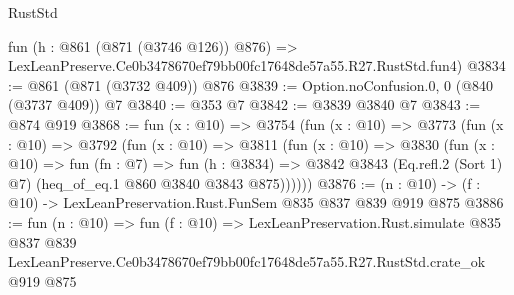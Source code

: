 \begin{lexlean}{RustStd}
\begin{coremodule}
    fun (h : @861 (@871 (@3746 @126)) @876) =>
    LexLeanPreserve.Ce0b3478670ef79bb00fc17648de57a55.R27.RustStd.fun4)
@3834 := @861 (@871 (@3732 @409)) @876
@3839 := Option.noConfusion.{0, 0} (@840 (@3737 @409)) @7
@3840 := @353 @7
@3842 := @3839 @3840 @7
@3843 := @874 @919
@3868 := fun (x : @10) =>
  @3754
    (fun (x : @10) =>
    @3773
      (fun (x : @10) =>
      @3792
        (fun (x : @10) =>
        @3811
          (fun (x : @10) =>
          @3830
            (fun (x : @10) =>
            fun (fn : @7) =>
            fun (h : @3834) =>
            @3842 @3843 (Eq.refl.{2} (Sort 1) @7) (heq_of_eq.{1} @860 @3840 @3843 @875))))))
@3876 := (n : @10) -> (f : @10) -> LexLeanPreservation.Rust.FunSem @835 @837 @839 @919 @875
@3886 := fun (n : @10) =>
  fun (f : @10) =>
  LexLeanPreservation.Rust.simulate
    @835
    @837
    @839
    LexLeanPreserve.Ce0b3478670ef79bb00fc17648de57a55.R27.RustStd.crate_ok
    @919
    @875
\end{coremodule}
\end{lexlean}
